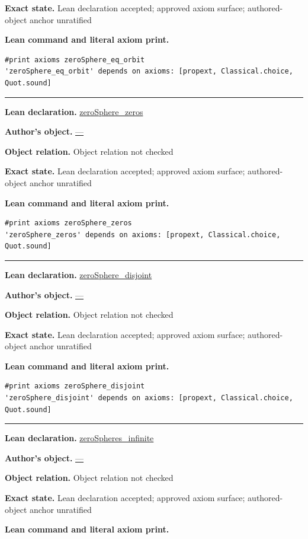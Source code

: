 \documentclass[11pt]{article}
\theoremstyle{plain}
\theoremstyle{definition}
\theoremstyle{remark}
\begin{document}
\begin{tcolorbox}
\par\textbf{Exact state.} Lean declaration accepted; approved axiom surface; authored-object anchor unratified
\par\smallskip\textbf{Lean command and literal axiom print.}
\begin{Verbatim}[breaklines=true,breakanywhere=true,fontsize=\small]
#print axioms zeroSphere_eq_orbit
'zeroSphere_eq_orbit' depends on axioms: [propext, Classical.choice, Quot.sound]
\end{Verbatim}
\medskip\hrule\medskip
\textbf{Lean declaration.} \url{zeroSphere_zeros}
\par\textbf{Author's object.} \url{—}
\par\textbf{Object relation.} Object relation not checked
\par\textbf{Exact state.} Lean declaration accepted; approved axiom surface; authored-object anchor unratified
\par\smallskip\textbf{Lean command and literal axiom print.}
\begin{Verbatim}[breaklines=true,breakanywhere=true,fontsize=\small]
#print axioms zeroSphere_zeros
'zeroSphere_zeros' depends on axioms: [propext, Classical.choice, Quot.sound]
\end{Verbatim}
\medskip\hrule\medskip
\textbf{Lean declaration.} \url{zeroSphere_disjoint}
\par\textbf{Author's object.} \url{—}
\par\textbf{Object relation.} Object relation not checked
\par\textbf{Exact state.} Lean declaration accepted; approved axiom surface; authored-object anchor unratified
\par\smallskip\textbf{Lean command and literal axiom print.}
\begin{Verbatim}[breaklines=true,breakanywhere=true,fontsize=\small]
#print axioms zeroSphere_disjoint
'zeroSphere_disjoint' depends on axioms: [propext, Classical.choice, Quot.sound]
\end{Verbatim}
\medskip\hrule\medskip
\textbf{Lean declaration.} \url{zeroSpheres_infinite}
\par\textbf{Author's object.} \url{—}
\par\textbf{Object relation.} Object relation not checked
\par\textbf{Exact state.} Lean declaration accepted; approved axiom surface; authored-object anchor unratified
\par\smallskip\textbf{Lean command and literal axiom print.}
\begin{Verbatim}[breaklines=true,breakanywhere=true,fontsize=\small]

\end{Verbatim}
\end{tcolorbox}
\end{document}
